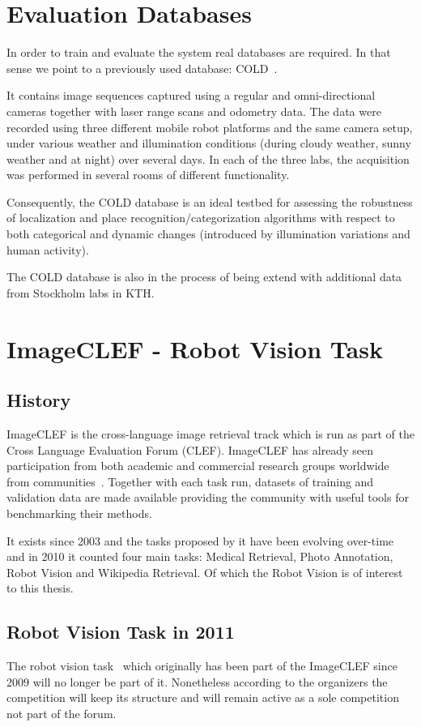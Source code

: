 \section{Evaluation Databases}\label{sec:databases}
In order to train and evaluate the system real databases are required. In that sense we point to a previously used database: \gls{COLD}~\citep{pronobis09ijrr-cold}.

It contains image sequences captured using a regular and omni-directional cameras together with laser range scans and odometry data.
The data were recorded using three different mobile robot platforms and the same camera setup, under various weather and illumination conditions (during cloudy weather, sunny weather and at night) over several days.
In each of the three labs, the acquisition was performed in several rooms of different functionality.



Consequently, the \gls{COLD} database is an ideal testbed for assessing the robustness of localization and place recognition/categorization algorithms with respect to both categorical and dynamic changes (introduced by illumination variations and human activity).

The \gls{COLD} database is also in the process of being extend with additional data from Stockholm labs in \gls{KTH}.


\section{{ImageCLEF} - Robot Vision Task}
\subsection{History}
\gls{ImageCLEF} is the cross-language image retrieval track which is run as part of the Cross Language Evaluation Forum (CLEF). \gls{ImageCLEF} has already seen participation from both academic and commercial research groups worldwide from communities~\citep{imageclef}.
Together with each task run, datasets of training and validation data are made available providing the community with useful tools for benchmarking their methods.

It exists since 2003 and the tasks proposed by it have been evolving over-time and in 2010 it counted four main tasks: Medical Retrieval, Photo Annotation, Robot Vision and Wikipedia Retrieval.
Of which the Robot Vision is of interest to this thesis.


\subsection{Robot Vision Task in 2011}
The robot vision task~\citep{pronobis2010imageclef} which originally has been part of the \gls{ImageCLEF} since 2009 will no longer be part of it.
Nonetheless according to the organizers the competition will keep its structure and will remain active as a sole competition not part of the forum.

